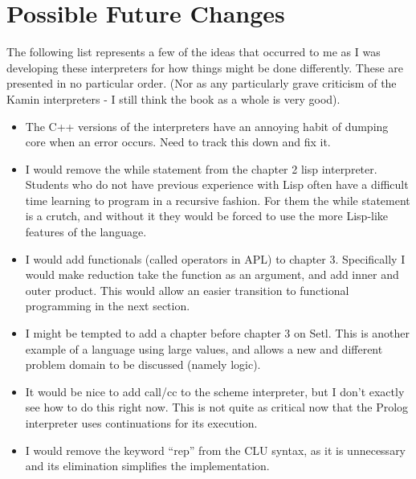 \chapter*{Possible Future Changes}

The following list represents a few of the ideas that occurred to me as I was
developing these interpreters for how things might be done differently.  These
are presented in no particular order.  (Nor as any particularly grave criticism
of the Kamin interpreters - I still think the book as a whole is very good).
\begin{itemize}
    \item The C++ versions of the interpreters have an annoying habit of dumping
    core when an error occurs.  Need to track this down and fix it.
    \item I would remove the while statement from the chapter 2 lisp
    interpreter.  Students who do not have previous experience with Lisp often
    have a difficult time learning to program in a recursive fashion.  For them
    the while statement is a crutch, and without it they would be forced to use
    the more Lisp-like features of the language.
    \item I would add functionals (called operators in APL) to chapter 3.
    Specifically I would make reduction take the function as an argument, and
    add inner and outer product.  This would allow an easier transition to
    functional programming in the next section.
    \item I might be tempted to add a chapter before chapter 3 on Setl.  This is
    another example of a language using large values, and allows a new and
    different problem domain to be discussed (namely logic).
    \item It would be nice to add call/cc to the scheme interpreter, but I don't
    exactly see how to do this right now.  This is not quite as critical now
    that the Prolog interpreter uses continuations for its execution.
    \item I would remove the keyword ``rep'' from the CLU syntax, as it is
    unnecessary and its elimination simplifies the implementation.
\end{itemize}
